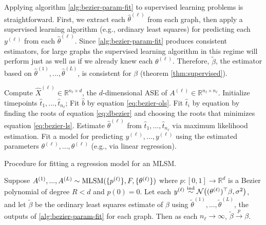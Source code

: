 \documentclass[12pt]{article}
\begin{document}
Applying algorithm \ref{alg:bezier-param-fit} to supervised learning
problems is straightforward. First, we extract each
\(\hat{\theta}^{(\ell)}\) from each graph, then apply a supervised
learning algorithm (e.g., ordinary least squares) for predicting each
\(y^{(\ell)}\) from each \(\hat{\theta}^{(\ell)}\). Since
\ref{alg:bezier-param-fit} produces consistent estimators, for large
graphs the supervised learning algorithm in this regime will perform
just as well as if we already knew each \(\theta^{(\ell)}\). Therefore,
\(\tilde{\beta}\), the estimator based on
\(\hat{\theta}^{(1)}, ..., \hat{\theta}^{(L)}\), is consistent for
\(\beta\) (theorem \ref{thm:supervised}).

\begin{algorithm}[H]
\label{alg:mlsm-fit}
\DontPrintSemicolon
\SetAlgoLined
{}
 {
  Compute $\hat{X}^{(\ell)} \in \mathbb{R}^{n_\ell \times d}$, the $d$-dimensional ASE of $A^{(\ell)} \in \mathbb{R}^{n_\ell \times n_\ell}$.\;
  Initialize timepoints $\hat{t}_1, ..., \hat{t}_{n_\ell}$;
   {
    Fit $\hat{b}$ by equation \ref{eq:bezier-ols}.\;
     {
      Fit $\hat{t}_i$ by equation by finding the roots of equation \ref{eq:dbezier} and choosing the roots that minimizes equation \ref{eq:bezier-ls}.\;
    }
  }
  Estimate $\hat{\theta}^{(\ell)}$ from $\hat{t}_1, ..., \hat{t}_{n_\ell}$ via maximum likelihood estimation.\;
}
Fit a model for predicting $y^{(\ell)}, ..., y^{(\ell)}$ using the estimated parameters $\theta^{(\ell)}, ..., \theta^{(\ell)}$ (e.g., via linear regression).\;
\caption{Procedure for fitting a regression model for an MLSM.}
\end{algorithm}

\begin{theorem}
\label{thm:supervised} 
Suppose $A^{(1)}, ..., A^{(L)} \sim \mathrm{MLSM}(\{p^{(\ell)}\}, F, \{\theta^{(\ell)}\})$ where $p : [0, 1] \to \mathbb{R}^d$ is a Bezier polynomial of degree $R < d$ and $p(0) = 0$. 
Let each $y^{(\ell)} \stackrel{\mathrm{ind}}{\sim} \mathcal{N}\big( (\theta^{(\ell)})^\top \beta, \sigma^2 \big)$, and let $\tilde{\beta}$ be the ordinary least squares estimate of $\beta$ using $\tilde{\theta}^{(1)}, ..., \tilde{\theta}^{(L)}$, the outputs of \ref{alg:bezier-param-fit} for each graph. 
Then as each $n_\ell \to \infty$, $\tilde{\beta} \stackrel{p}{\to} \beta$. 
\end{theorem}
\end{document}
